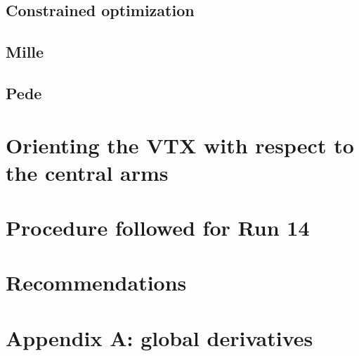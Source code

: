 \documentclass{article}
\begin{document}
\subsection{Constrained optimization}
\subsection{Mille}
\subsection{Pede}
\section{Orienting the VTX with respect to the central arms}
\section{Procedure followed for Run 14}
\section{Recommendations}
\section{Appendix A: global derivatives}
\end{document}
